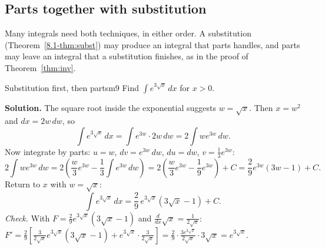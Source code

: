 \documentclass[11pt]{article}
\begin{document}
\subsection*{Parts together with substitution}

Many integrals need both techniques, in either order. A substitution (Theorem~\ref{8.1-thm:subst}) may produce an integral that parts handles, and parts may leave an integral that a substitution finishes, as in the proof of Theorem~\ref{thm:inv}.

\begin{exmp}{Substitution first, then parts}{m9}
Find $\int e^{3\sqrt x}\,dx$ for $x>0$.

\textbf{Solution.} The square root inside the exponential suggests $w=\sqrt x$. Then $x=w^2$ and $dx=2w\,dw$, so
\[\int e^{3\sqrt x}\,dx=\int e^{3w}\cdot2w\,dw=2\int we^{3w}\,dw .\]
Now integrate by parts: $u=w$, $dv=e^{3w}\,dw$, $du=dw$, $v=\frac13e^{3w}$:
\[2\int we^{3w}\,dw=2\left(\frac w3e^{3w}-\frac13\int e^{3w}\,dw\right)=2\left(\frac w3e^{3w}-\frac19e^{3w}\right)+C=\frac29e^{3w}\left(3w-1\right)+C .\]
Return to $x$ with $w=\sqrt x$:
\[\int e^{3\sqrt x}\,dx=\frac29\,e^{3\sqrt x}\left(3\sqrt x-1\right)+C .\]
\emph{Check.} With $F=\frac29e^{3\sqrt x}\left(3\sqrt x-1\right)$ and $\frac{d}{dx}\sqrt x=\frac1{2\sqrt x}$: $F'=\frac29\left[\frac{3}{2\sqrt x}e^{3\sqrt x}\left(3\sqrt x-1\right)+e^{3\sqrt x}\cdot\frac3{2\sqrt x}\right]=\frac29\cdot\frac{3e^{3\sqrt x}}{2\sqrt x}\cdot3\sqrt x=e^{3\sqrt x}$.
\end{exmp}
\end{document}
